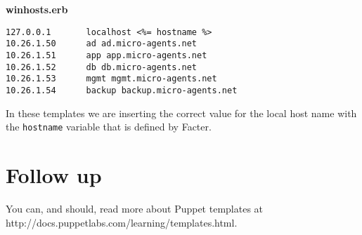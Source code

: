 \documentclass{article}   	%
\begin{document}
\textbf{winhosts.erb}
\begin{verbatim}
127.0.0.1       localhost <%= hostname %>
10.26.1.50      ad ad.micro-agents.net
10.26.1.51      app app.micro-agents.net
10.26.1.52      db db.micro-agents.net
10.26.1.53      mgmt mgmt.micro-agents.net
10.26.1.54      backup backup.micro-agents.net

\end{verbatim}

In these templates we are inserting the correct value for the local host name with the \texttt{hostname} variable that is defined by Facter.


\section{Follow up}
You can, and should, read more about Puppet templates at http://docs.puppetlabs.com/learning/templates.html.
\end{document}
